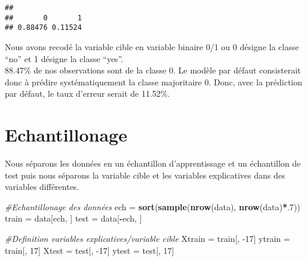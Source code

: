 \documentclass[
]{article}
\newenvironment{Shaded}{\begin{snugshade}}{\end{snugshade}}
\newcommand{\CommentTok}[1]{\textcolor[rgb]{0.56,0.35,0.01}{\textit{#1}}}
\newcommand{\DecValTok}[1]{\textcolor[rgb]{0.00,0.00,0.81}{#1}}
\newcommand{\KeywordTok}[1]{\textcolor[rgb]{0.13,0.29,0.53}{\textbf{#1}}}
\newcommand{\NormalTok}[1]{#1}
\newcommand{\OperatorTok}[1]{\textcolor[rgb]{0.81,0.36,0.00}{\textbf{#1}}}
\newcommand{\StringTok}[1]{\textcolor[rgb]{0.31,0.60,0.02}{#1}}
\begin{document}
\begin{Shaded}
\end{Shaded}

\begin{verbatim}
## 
##       0       1 
## 0.88476 0.11524
\end{verbatim}

Nous avons recodé la variable cible en variable binaire 0/1 ou 0 désigne
la classe ``no'' et 1 désigne la classe ``yes''.\\
88.47\% de nos observations sont de la classe 0. Le modèle par défaut
consisterait donc à prédire systématiquement la classe majoritaire 0.
Donc, avec la prédiction par défaut, le taux d'erreur serait de 11.52\%.

\hypertarget{echantillonage}{%
\section{Echantillonage}\label{echantillonage}}

Nous séparons les données en un échantillon d'apprentissage et un
échantillon de test puis nous séparons la variable cible et les
variables explicatives dans des variables différentes.

\begin{Shaded}
\begin{Highlighting}[]
\CommentTok{#Echantillonage des données}
\NormalTok{ech =}\StringTok{ }\KeywordTok{sort}\NormalTok{(}\KeywordTok{sample}\NormalTok{(}\KeywordTok{nrow}\NormalTok{(data), }\KeywordTok{nrow}\NormalTok{(data)}\OperatorTok{*}\NormalTok{.}\DecValTok{7}\NormalTok{))}
\NormalTok{train =}\StringTok{ }\NormalTok{data[ech, ]}
\NormalTok{test =}\StringTok{ }\NormalTok{data[}\OperatorTok{-}\NormalTok{ech, ]}

\CommentTok{#Definition variables explicatives/variable cible}
\NormalTok{Xtrain =}\StringTok{ }\NormalTok{train[, }\DecValTok{-17}\NormalTok{]}
\NormalTok{ytrain =}\StringTok{ }\NormalTok{train[, }\DecValTok{17}\NormalTok{]}
\NormalTok{Xtest =}\StringTok{ }\NormalTok{test[, }\DecValTok{-17}\NormalTok{]}
\NormalTok{ytest =}\StringTok{ }\NormalTok{test[, }\DecValTok{17}\NormalTok{]}
\end{Highlighting}
\end{Shaded}
\end{document}
